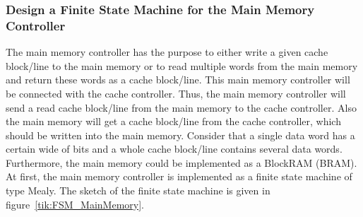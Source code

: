 \subsubsection{Design a Finite State Machine for the Main Memory Controller}
The main memory controller has the purpose to either write a given cache block/line to the main memory or to read multiple words from the main memory and return these words as a cache block/line. This main memory controller will be connected with the cache controller. Thus, the main memory controller will send a read cache block/line from the main memory to the cache controller. Also the main memory will get a cache block/line from the cache controller, which should be written into the main memory. Consider that a single data word has a certain wide of bits and a whole cache block/line contains several data words. Furthermore, the main memory could be implemented as a BlockRAM (BRAM). At first, the main memory controller is implemented as a finite state machine of type Mealy. The sketch of the finite state machine is given in figure~\ref{tik:FSM_MainMemory}.


